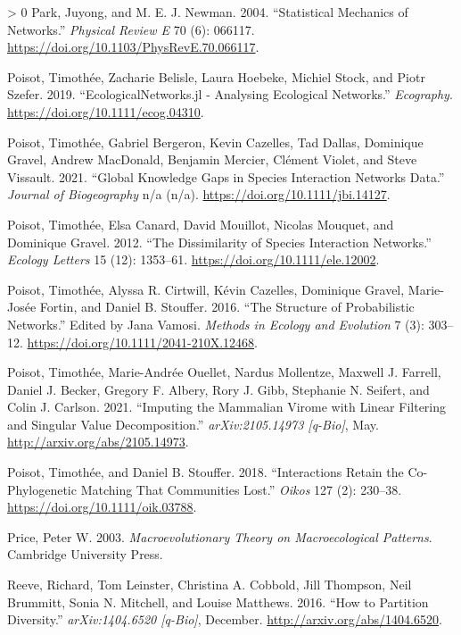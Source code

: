 \documentclass[10pt,oneside]{article}
\newlength{\cslhangindent}
\newenvironment{CSLReferences}[3] %
 {%
  \setlength{\parindent}{0pt}
  \ifodd #1 \everypar{\setlength{\hangindent}{\cslhangindent}}\ignorespaces\fi
  \ifnum #2 > 0
  \setlength{\parskip}{#2\baselineskip}
  \fi
 }%
 {}
\begin{document}
\begin{CSLReferences}{1}{0}
\leavevmode\hypertarget{ref-Park2004StaMec}{}%
Park, Juyong, and M. E. J. Newman. 2004. {``Statistical Mechanics of
Networks.''} \emph{Physical Review E} 70 (6): 066117.
\url{https://doi.org/10.1103/PhysRevE.70.066117}.

\leavevmode\hypertarget{ref-Poisot2019EcoJl}{}%
Poisot, Timothée, Zacharie Belisle, Laura Hoebeke, Michiel Stock, and
Piotr Szefer. 2019. {``EcologicalNetworks.jl - Analysing Ecological
Networks.''} \emph{Ecography}. \url{https://doi.org/10.1111/ecog.04310}.

\leavevmode\hypertarget{ref-Poisot2021GloKno}{}%
Poisot, Timothée, Gabriel Bergeron, Kevin Cazelles, Tad Dallas,
Dominique Gravel, Andrew MacDonald, Benjamin Mercier, Clément Violet,
and Steve Vissault. 2021. {``Global Knowledge Gaps in Species
Interaction Networks Data.''} \emph{Journal of Biogeography} n/a (n/a).
\url{https://doi.org/10.1111/jbi.14127}.

\leavevmode\hypertarget{ref-Poisot2012DisSpea}{}%
Poisot, Timothée, Elsa Canard, David Mouillot, Nicolas Mouquet, and
Dominique Gravel. 2012. {``The Dissimilarity of Species Interaction
Networks.''} \emph{Ecology Letters} 15 (12): 1353--61.
\url{https://doi.org/10.1111/ele.12002}.

\leavevmode\hypertarget{ref-Poisot2016StrPro}{}%
Poisot, Timothée, Alyssa R. Cirtwill, Kévin Cazelles, Dominique Gravel,
Marie-Josée Fortin, and Daniel B. Stouffer. 2016. {``The Structure of
Probabilistic Networks.''} Edited by Jana Vamosi. \emph{Methods in
Ecology and Evolution} 7 (3): 303--12.
\url{https://doi.org/10.1111/2041-210X.12468}.

\leavevmode\hypertarget{ref-Poisot2021ImpMam}{}%
Poisot, Timothée, Marie-Andrée Ouellet, Nardus Mollentze, Maxwell J.
Farrell, Daniel J. Becker, Gregory F. Albery, Rory J. Gibb, Stephanie N.
Seifert, and Colin J. Carlson. 2021. {``Imputing the Mammalian Virome
with Linear Filtering and Singular Value Decomposition.''}
\emph{arXiv:2105.14973 {[}q-Bio{]}}, May.
\url{http://arxiv.org/abs/2105.14973}.

\leavevmode\hypertarget{ref-Poisot2018IntRet}{}%
Poisot, Timothée, and Daniel B. Stouffer. 2018. {``Interactions Retain
the Co-Phylogenetic Matching That Communities Lost.''} \emph{Oikos} 127
(2): 230--38. \url{https://doi.org/10.1111/oik.03788}.

\leavevmode\hypertarget{ref-Price2003MacThe}{}%
Price, Peter W. 2003. \emph{Macroevolutionary Theory on Macroecological
Patterns}. Cambridge University Press.

\leavevmode\hypertarget{ref-Reeve2016HowPar}{}%
Reeve, Richard, Tom Leinster, Christina A. Cobbold, Jill Thompson, Neil
Brummitt, Sonia N. Mitchell, and Louise Matthews. 2016. {``How to
Partition Diversity.''} \emph{arXiv:1404.6520 {[}q-Bio{]}}, December.
\url{http://arxiv.org/abs/1404.6520}.


\end{CSLReferences}
\end{document}
